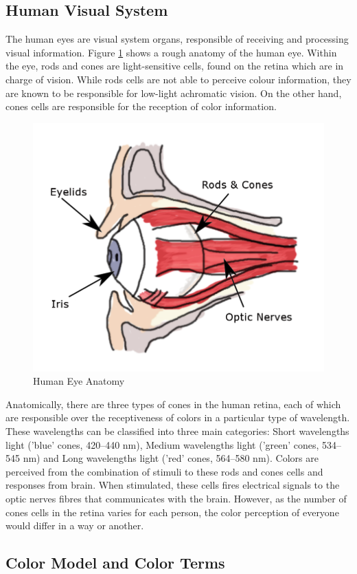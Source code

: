 \subsection{Human Visual System}
\label{section:eyes}
The human eyes are visual system organs, responsible of receiving and processing visual information. Figure \ref{fig:eyes} shows a rough anatomy of the human eye. Within the eye, rods and cones are light-sensitive cells, found on the retina which are in charge of vision. While rods cells are not able to perceive colour information, they are known to be responsible for low-light achromatic vision. On the other hand, cones cells are responsible for the reception of color information.   


\begin{figure}[hbt!]\centering
\includegraphics[width=.5\textwidth]{image/lit/rodsandconscolored.png}
\caption{Human Eye Anatomy}
\label{fig:eyes}
\end{figure}

Anatomically, there are three types of cones in the human retina, each of which are responsible over the receptiveness of colors in a particular type of wavelength. These wavelengths can be classified into three main categories: Short wavelengths light ('blue' cones, 420–440 nm), Medium  wavelengths light ('green' cones, 534–545 nm) and Long wavelengths light ('red' cones, 564–580 nm). Colors are perceived from the combination of stimuli to these rods and cones cells and responses from brain. When stimulated, these cells fires electrical signals to the optic nerves fibres that communicates with the brain. However, as the number of cones cells in the retina varies for each person, the color perception of everyone would differ in a way or another. 






\subsection{Color Model and Color Terms}

